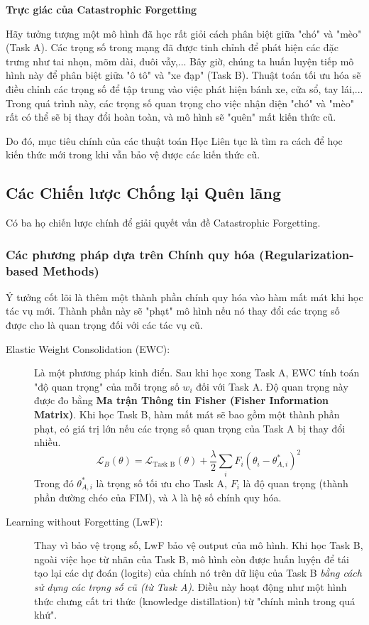 \begin{mdframed}[style=infobox]
	\textbf{Trực giác của Catastrophic Forgetting}
	
	Hãy tưởng tượng một mô hình đã học rất giỏi cách phân biệt giữa "chó" và "mèo" (Task A). Các trọng số trong mạng đã được tinh chỉnh để phát hiện các đặc trưng như tai nhọn, mõm dài, đuôi vẫy,... Bây giờ, chúng ta huấn luyện tiếp mô hình này để phân biệt giữa "ô tô" và "xe đạp" (Task B). Thuật toán tối ưu hóa sẽ điều chỉnh các trọng số để tập trung vào việc phát hiện bánh xe, cửa sổ, tay lái,... Trong quá trình này, các trọng số quan trọng cho việc nhận diện "chó" và "mèo" rất có thể sẽ bị thay đổi hoàn toàn, và mô hình sẽ "quên" mất kiến thức cũ.
\end{mdframed}

Do đó, mục tiêu chính của các thuật toán Học Liên tục là tìm ra cách để học kiến thức mới trong khi vẫn bảo vệ được các kiến thức cũ.

\subsection{Các Chiến lược Chống lại Quên lãng}
\label{subsec:cl_strategies}
Có ba họ chiến lược chính để giải quyết vấn đề Catastrophic Forgetting.

\subsubsection{Các phương pháp dựa trên Chính quy hóa (Regularization-based Methods)}
\label{subsubsec:regularization_based_cl}
Ý tưởng cốt lõi là thêm một thành phần chính quy hóa vào hàm mất mát khi học tác vụ mới. Thành phần này sẽ "phạt" mô hình nếu nó thay đổi các trọng số được cho là quan trọng đối với các tác vụ cũ.
\begin{description}
	\item[Elastic Weight Consolidation (EWC):] \cite{Kirkpatrick2017} Là một phương pháp kinh điển. Sau khi học xong Task A, EWC tính toán "độ quan trọng" của mỗi trọng số $w_i$ đối với Task A. Độ quan trọng này được đo bằng \textbf{Ma trận Thông tin Fisher (Fisher Information Matrix)}. Khi học Task B, hàm mất mát sẽ bao gồm một thành phần phạt, có giá trị lớn nếu các trọng số quan trọng của Task A bị thay đổi nhiều.
	\begin{equation}
		\mathcal{L}_B(\theta) = \mathcal{L}_{\text{Task B}}(\theta) + \frac{\lambda}{2} \sum_i F_i (\theta_i - \theta_{A,i}^*)^2
	\end{equation}
	Trong đó $\theta_{A,i}^*$ là trọng số tối ưu cho Task A, $F_i$ là độ quan trọng (thành phần đường chéo của FIM), và $\lambda$ là hệ số chính quy hóa.
	\item[Learning without Forgetting (LwF):] \cite{Li2017} Thay vì bảo vệ trọng số, LwF bảo vệ output của mô hình. Khi học Task B, ngoài việc học từ nhãn của Task B, mô hình còn được huấn luyện để tái tạo lại các dự đoán (logits) của chính nó trên dữ liệu của Task B \textit{bằng cách sử dụng các trọng số cũ (từ Task A)}. Điều này hoạt động như một hình thức chưng cất tri thức (knowledge distillation) từ "chính mình trong quá khứ".
\end{description}

